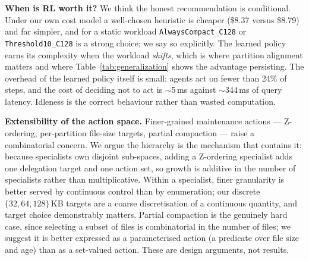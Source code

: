 \documentclass[fleqn,10pt]{wlscirep}
\begin{document}
\textbf{When is RL worth it?}
We think the honest recommendation is conditional. Under our own cost
model a well-chosen heuristic is cheaper (\$8.37 versus \$8.79) and far
simpler, and for a static workload \texttt{AlwaysCompact\_C128} or
\texttt{Threshold10\_C128} is a strong choice; we say so explicitly. The
learned policy earns its complexity when the workload \emph{shifts},
which is where partition alignment matters and where
Table~\ref{tab:generalization} shows the advantage persisting. The
overhead of the learned policy itself is small: agents act on fewer than
24\% of steps, and the cost of deciding not to act is $\sim$5\,ms
against $\sim$344\,ms of query latency. Idleness is the correct
behaviour rather than wasted computation.

\textbf{Extensibility of the action space.}
Finer-grained maintenance actions --- Z-ordering, per-partition file-size
targets, partial compaction --- raise a combinatorial concern. We argue
the hierarchy is the mechanism that contains it: because specialists own
disjoint sub-spaces, adding a Z-ordering specialist adds one delegation
target and one action set, so growth is additive in the number of
specialists rather than multiplicative. Within a specialist, finer
granularity is better served by continuous control than by enumeration;
our discrete $\{32, 64, 128\}$\,KB targets are a coarse discretisation
of a continuous quantity, and target choice demonstrably matters. Partial
compaction is the genuinely hard case, since selecting a subset of files
is combinatorial in the number of files; we suggest it is better
expressed as a parameterised action (a predicate over file size and age)
than as a set-valued action. These are design arguments, not results.
\end{document}
